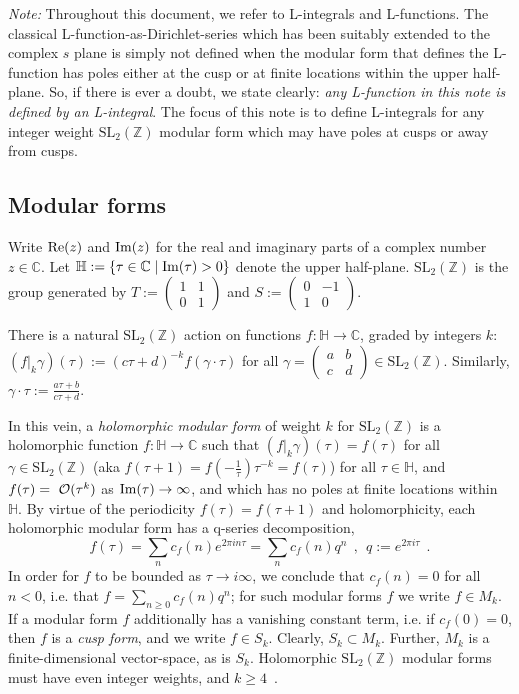 \documentclass[11pt]{article}
\newcommand{\HH}{\mathbb{H}}
\newcommand{\ZZ}{\mathbb{Z}}
\newcommand{\CC}{\mathbb{C}}
\newcommand{\SLZ}{\mathrm{SL}_2(\ZZ)}
\begin{document}
{\em Note:} Throughout this document, we refer to L-integrals and L-functions. The classical 
L-function-as-Dirichlet-series which has been suitably extended to the complex $s$ plane is 
simply not defined when the modular form that defines the L-function has poles either at the 
cusp or at finite locations within the upper half-plane. So, if there is ever a doubt, we state clearly: 
{\em any L-function in this note is defined by an L-integral}. The focus of this note is to define 
L-integrals for any integer weight $\SLZ$ modular form which may have poles at cusps or away 
from cusps.

\subsection{Modular forms}
Write ${\rm Re}(z)$ and ${\rm Im}(z)$ for the real and imaginary parts of a complex number 
$z\in \CC$. Let $\HH:=\{\tau\in\CC\mid {\rm Im}(\tau)>0\}$ denote the upper half-plane. $\SLZ$ 
is the group generated by $T := \left( \begin{smallmatrix} 1 & 1 \\ 0 & 1 \end{smallmatrix} \right)$ 
and $S := \left( \begin{smallmatrix} 0 & -1 \\ 1 & 0 \end{smallmatrix} \right)$. 

There is a natural $\SLZ$ action on functions $f: \HH \to \CC$, graded by integers $k$: 
$(f|_k \gamma)(\tau) := (c \tau + d)^{-k}f(\gamma\cdot\tau)$ for all $\gamma = \left(\begin{smallmatrix}
a & b \\ c & d \end{smallmatrix}\right) \in \SLZ$. Similarly, $\gamma\cdot \tau := 
\frac{a \tau + b}{c \tau + d}$. 

In this vein, a {\em holomorphic modular form} of weight $k$ for $\SLZ$ is a 
holomorphic function $f:\HH\to \CC$ such that $(f|_k\gamma)(\tau) = f(\tau)$ 
for all $\gamma \in \SLZ$ (aka $f(\tau+1)=f(-\frac1\tau)\tau^{-k}=f(\tau)$) for 
all $\tau\in \HH$, and $f(\tau)={\cal~O}(\tau^k)$ as ${\rm Im}(\tau)\to \infty$, and 
which has no poles at finite locations within $\HH$. By virtue of the periodicity 
$f(\tau) = f(\tau+1)$ and holomorphicity, each holomorphic modular form has 
a q-series decomposition,
\begin{equation}
f(\tau) = \sum_n c_f(n) e^{2 \pi i n \tau} = \sum_n c_f(n) q^n~~,~~q:= e^{2 \pi i \tau}~~.
\end{equation}
In order for $f$ to be bounded as $\tau \to i \infty$, we conclude that $c_f(n) = 0$ 
for all $n < 0$, i.e. that $f = \sum_{n \geq 0} c_f(n) q^n$; for such modular forms $f$ 
we write $f \in M_k$. If a modular form $f$ additionally has a vanishing constant term, 
i.e. if $c_f(0) = 0$, then $f$ is a {\em cusp form}, 
and we write $f \in S_k$. Clearly, $S_k \subset M_k$. Further, $M_k$ is a  
finite-dimensional vector-space, as is $S_k$. Holomorphic $\SLZ$ modular forms must 
have even integer weights, and $k \geq 4$~\cite{01-Apostol}. 
\end{document}
